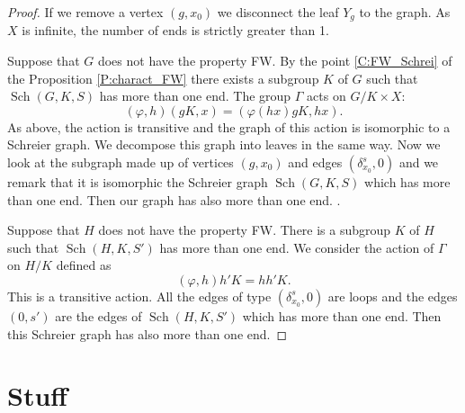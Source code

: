 \documentclass[a4paper]{article}
\theoremstyle{remark}%
\DeclareMathOperator\Sch{Sch}
\renewcommand*{\phi}{\varphi}
\begin{document}
\begin{proof}
If we remove a vertex $(g,x_0)$ we disconnect the leaf $Y_g$ to the graph. As $X$ is infinite, the number of ends is strictly greater than 1.

Suppose that $G$ does not have the property FW. By the point \ref{C:FW_Schrei} of the Proposition \ref{P:charact_FW} there exists a subgroup $K$ of $G$ such that $\Sch(G,K,S)$ has more than one end. The group $\Gamma$ acts on $G/K \times X$:  
\begin{equation*}
(\phi,h)(gK,x) = (\phi(hx) gK, hx).
\end{equation*}
As above, the action is transitive and the graph of this action is isomorphic to a Schreier graph. We decompose this graph into leaves in the same way. Now we look at the subgraph made up of vertices $(g,x_0)$ and edges $(\delta_{x_0}^s,0)$ and we remark that it is isomorphic the Schreier graph $\Sch(G,K,S)$ which has more than one end. Then our graph has also more than one end.
.


Suppose that $H$ does not have the property FW. There is a subgroup $K$ of $H$ such that $\Sch(H,K,S')$ has more than one end. We consider the action of $\Gamma$ on $H/K$ defined as
\begin{equation*}
 (\phi,h)h'K = hh'K.
\end{equation*}
This is a transitive action. All the edges of type $(\delta_{x_0}^s, 0)$ are loops and the edges $(0, s')$ are the edges of $\Sch(H,K,S')$ which has more than one end. Then this Schreier graph has also more than one end.
\end{proof}


\section{Stuff}














\enddocument
\end{document}
